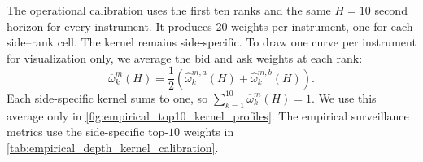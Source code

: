 \documentclass[11pt]{article}
\begin{document}
The operational calibration uses the first ten ranks and the same $H=10$ second horizon for every instrument. It produces
20 weights per instrument, one for each side--rank cell. The kernel remains side-specific. To draw one curve per
instrument for visualization only, we average the bid and ask weights at each rank:
\begin{equation}
    \overline{\omega}^{m}_{k}(H)
    =
    \frac{1}{2}\left(
        \widehat\omega^{m,a}_{k}(H)
        +
        \widehat\omega^{m,b}_{k}(H)
    \right).
    \label{eq:side_averaged_empirical_kernel}
\end{equation}
Each side-specific kernel sums to one, so $\sum_{k=1}^{10}\overline{\omega}^{m}_{k}(H)=1$. We use this average only in
\cref{fig:empirical_top10_kernel_profiles}. The empirical surveillance metrics use the side-specific top-$10$ weights in
\cref{tab:empirical_depth_kernel_calibration}.
\end{document}
